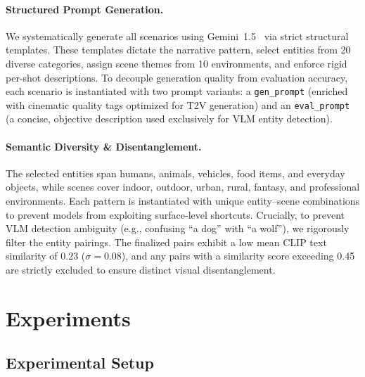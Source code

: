 \documentclass[sigconf,review,anonymous]{acmart}
\theoremstyle{definition}
\begin{document}
\paragraph{Structured Prompt Generation.}
We systematically generate all scenarios using Gemini~1.5~\cite{gemini} via strict structural templates. These templates dictate the narrative pattern, select entities from 20 diverse categories, assign scene themes from 10 environments, and enforce rigid per-shot descriptions. To decouple generation quality from evaluation accuracy, each scenario is instantiated with two prompt variants: a \texttt{gen\_prompt} (enriched with cinematic quality tags optimized for T2V generation) and an \texttt{eval\_prompt} (a concise, objective description used exclusively for VLM entity detection).

\paragraph{Semantic Diversity \& Disentanglement.}
The selected entities span humans, animals, vehicles, food items, and everyday objects, while scenes cover indoor, outdoor, urban, rural, fantasy, and professional environments. Each pattern is instantiated with unique entity--scene combinations to prevent models from exploiting surface-level shortcuts. Crucially, to prevent VLM detection ambiguity (e.g., confusing ``a dog'' with ``a wolf''), we rigorously filter the entity pairings. The finalized pairs exhibit a low mean CLIP text similarity of 0.23 ($\sigma = 0.08$), and any pairs with a similarity score exceeding 0.45 are strictly excluded to ensure distinct visual disentanglement.
\section{Experiments}
\label{sec:experiments}

\subsection{Experimental Setup}
\label{sec:setup}
\end{document}
